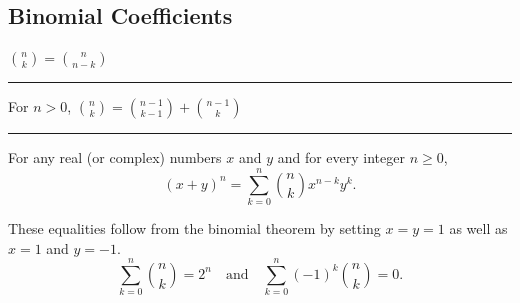 \documentclass[a4paper]{extarticle}
\newcommand{\Proof}{\textbf{Proof.}\ }
\newcommand{\sep}{\vspace{5pt}\noindent\hrule\vspace{5pt}}
\begin{document}
\begin{multicols*}{2}
\subsection{Binomial Coefficients}

$
\binom{n}{k}=\binom{n}{n-k}
$

\sep

 For $n>0$,
$
\binom{n}{k}=\binom{n-1}{k-1}+\binom{n-1}{k}
$

\sep

 For any real (or complex) numbers $x$ and
$y$ and for every integer $n\geq 0$,
\[
(x+y)^n=\sum_{k=0}^{n}\binom{n}{k}x^{n-k}y^k.
\]

\Cor These equalities follow from the binomial theorem by setting $x=y=1$ as
well as $x=1$ and $y=-1$.
\[
\sum_{k=0}^{n}\binom{n}{k}=2^n \quad \text{and} \quad
\sum_{k=0}^{n}(-1)^k\binom{n}{k}=0.
\]

\end{multicols*}
\end{document}
